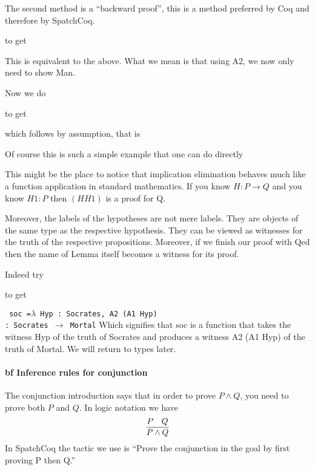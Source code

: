 \begin{itemize}
The second method is a ``backward proof'', this is a method preferred by Coq and therefore by SpatchCoq.

 
 to get

This is equivalent to the above. What we mean is that using A2, we now only need to show Man.

Now we do
 
 to get
 
 which follows by assumption, that is
 
 
 Of course this is such a simple example that one can do directly 
 
 
\begin{tcolorbox}[colback=red!5!white,colframe=black]
This might be the place to notice that implication elimination behaves much like a function application in standard mathematics. If you know $H:P\rightarrow Q$  and you know $H1:P$ then $(H H1)$ is a proof for Q. 

Moreover, the labels of the hypotheses are not mere labels. They are objects of the same type as the respective hypothesis. They can be viewed as witnesses for the truth of the respective propositions. Moreover, if we finish our proof with Qed then the name of Lemma itself becomes a witness for its proof.

 
 \end{tcolorbox}
Indeed try

to get 

\texttt{
soc =$ \lambda$ Hyp : Socrates, A2 (A1 Hyp) \\
     : Socrates $\rightarrow$ Mortal}
 Which signifies that soc is a function  that takes the witness Hyp of the truth of Socrates and produces a witness A2 (A1 Hyp) of the truth of Mortal.
 We will return to types later.





\paragraph{bf Inference rules for conjunction}
The conjunction introduction says that in order to prove $P\land Q$, you need to prove both $P$ and $Q$. In logic notation we have
$$\infer{P\land Q}{P & Q}$$
In SpatchCoq the tactic we use is ``Prove the conjunction in the goal by first proving P then Q.''


\end{itemize}
